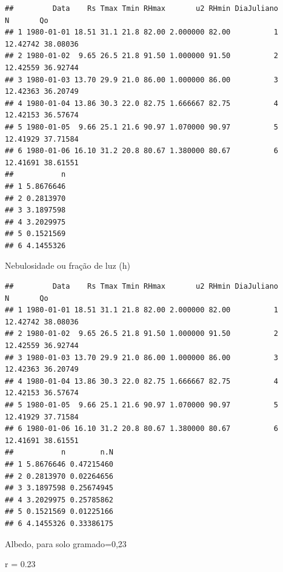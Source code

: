 \documentclass[
]{book}
\newenvironment{Shaded}{\begin{snugshade}}{\end{snugshade}}
\newcommand{\FloatTok}[1]{\textcolor[rgb]{0.00,0.00,0.81}{#1}}
\newcommand{\KeywordTok}[1]{\textcolor[rgb]{0.13,0.29,0.53}{\textbf{#1}}}
\newcommand{\NormalTok}[1]{#1}
\newcommand{\OperatorTok}[1]{\textcolor[rgb]{0.81,0.36,0.00}{\textbf{#1}}}
\newcommand{\StringTok}[1]{\textcolor[rgb]{0.31,0.60,0.02}{#1}}
\begin{document}
\begin{verbatim}
##         Data    Rs Tmax Tmin RHmax       u2 RHmin DiaJuliano        N       Qo
## 1 1980-01-01 18.51 31.1 21.8 82.00 2.000000 82.00          1 12.42742 38.08036
## 2 1980-01-02  9.65 26.5 21.8 91.50 1.000000 91.50          2 12.42559 36.92744
## 3 1980-01-03 13.70 29.9 21.0 86.00 1.000000 86.00          3 12.42363 36.20749
## 4 1980-01-04 13.86 30.3 22.0 82.75 1.666667 82.75          4 12.42153 36.57674
## 5 1980-01-05  9.66 25.1 21.6 90.97 1.070000 90.97          5 12.41929 37.71584
## 6 1980-01-06 16.10 31.2 20.8 80.67 1.380000 80.67          6 12.41691 38.61551
##           n
## 1 5.8676646
## 2 0.2813970
## 3 3.1897598
## 4 3.2029975
## 5 0.1521569
## 6 4.1455326
\end{verbatim}

Nebulosidade ou fração de luz (h)

\begin{Shaded}
\end{Shaded}

\begin{verbatim}
##         Data    Rs Tmax Tmin RHmax       u2 RHmin DiaJuliano        N       Qo
## 1 1980-01-01 18.51 31.1 21.8 82.00 2.000000 82.00          1 12.42742 38.08036
## 2 1980-01-02  9.65 26.5 21.8 91.50 1.000000 91.50          2 12.42559 36.92744
## 3 1980-01-03 13.70 29.9 21.0 86.00 1.000000 86.00          3 12.42363 36.20749
## 4 1980-01-04 13.86 30.3 22.0 82.75 1.666667 82.75          4 12.42153 36.57674
## 5 1980-01-05  9.66 25.1 21.6 90.97 1.070000 90.97          5 12.41929 37.71584
## 6 1980-01-06 16.10 31.2 20.8 80.67 1.380000 80.67          6 12.41691 38.61551
##           n        n.N
## 1 5.8676646 0.47215460
## 2 0.2813970 0.02264656
## 3 3.1897598 0.25674945
## 4 3.2029975 0.25785862
## 5 0.1521569 0.01225166
## 6 4.1455326 0.33386175
\end{verbatim}

Albedo, para solo gramado=0,23

\begin{Shaded}
\begin{Highlighting}[]
\NormalTok{ r =}\StringTok{ }\FloatTok{0.23} 
\end{Highlighting}
\end{Shaded}
\end{document}
